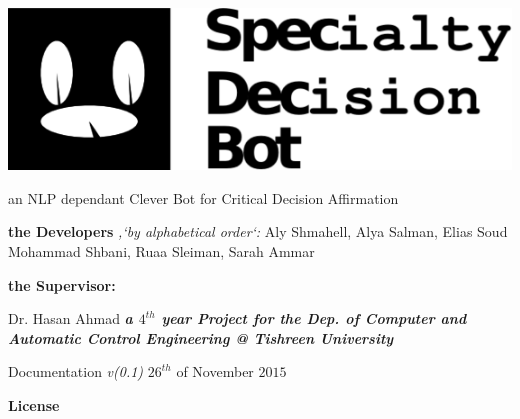 \documentclass{paper}
\begin{document}
\includegraphics[]{./SpecDecBot-Main.png}
\newline\newline
\begin{large}{an NLP dependant Clever Bot for Critical Decision Affirmation\newline\newline}\end{large}
\Large{\textbf{the Developers}}
\textit{,`by alphabetical order`:\newline}
Aly Shmahell, Alya Salman, Elias Soud\newline
Mohammad Shbani, Ruaa Sleiman, Sarah Ammar\newline\newline
\begin{Large}{\textbf{the Supervisor:}}\end{Large}
Dr. Hasan Ahmad\newline
\newline
\textbf{\textit{a $ 4^{th} $ year Project for the Dep. of Computer and Automatic Control Engineering @ Tishreen University}}\newline\newline
\begin{center}
Documentation \textit{v(0.1)}\newline
$ 26^{th} $ of November $ 2015 $\newline
\end{center}
\newpage
\begin{huge}{\textbf{License\newline\newline}}\end{huge}
\end{document}
